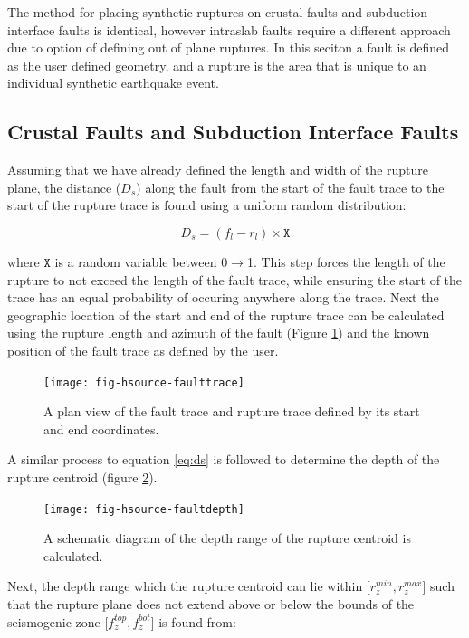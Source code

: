 The method for placing synthetic ruptures on crustal faults and subduction interface faults is identical, however intraslab faults require a 
different approach due to option of defining out of plane ruptures. In this seciton a fault is defined as the user defined geometry, and
a rupture is the area that is unique to an individual synthetic earthquake event. \\

\subsection{Crustal Faults and Subduction Interface Faults}
Assuming that we have already defined the length and width of the rupture plane, the distance ($D_s$) along the fault from the start of the fault trace to
the start of the rupture trace is found using a uniform random distribution:

\begin{equation} \label{eq:ds}
D_s = (f_l - r_l) \times \mathtt{X}
\end{equation}

where $\mathtt{X}$ is a random variable between 0$\rightarrow$1. This step forces the length of the rupture to not exceed the length of the fault trace, while 
ensuring the start of the trace has an equal probability of occuring anywhere along the trace. Next the geographic location of the start and end of the rupture trace can be 
calculated using the rupture length and azimuth of the fault (Figure \ref{fig:traces}) and the known position of the fault trace as defined by the user. 

\begin{figure}[htp]
\centerline{\texttt{[image: fig-hsource-faulttrace]}}
\caption{A plan view of the fault trace and rupture trace defined by its start and end coordinates.}
\label{fig:traces}
\end{figure}

A similar process to equation \ref{eq:ds} is followed to determine the depth of the rupture centroid (figure \ref{fig:rzrange}). 

\begin{figure}[htp]
\centerline{\texttt{[image: fig-hsource-faultdepth]}}
\caption{A schematic diagram of the depth range of the rupture centroid is calculated.}
\label{fig:rzrange}
\end{figure}

Next, the depth range which the rupture centroid can lie within [$r_z^{min}, r_z^{max}$] such that 
the rupture plane does not extend above or below the bounds of the seismogenic zone [$f_z^{top}, f_z^{bot}$] is found from:

